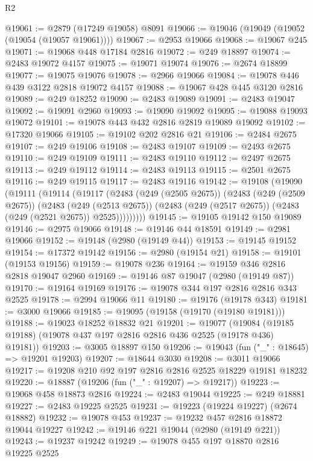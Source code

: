 \begin{lexlean}{R2}
\begin{coremodule}
@19061 := @2879 (@17249 @19058) @8091
@19066 := @19046 (@19049 (@19052 (@19054 (@19057 @19061))))
@19067 := @2953 @19066
@19068 := @19067 @245
@19071 := @19068 @448 @17184 @2816
@19072 := @249 @18897
@19074 := @2483 @19072 @4157
@19075 := @19071 @19074
@19076 := @2674 @18899
@19077 := @19075 @19076
@19078 := @2966 @19066
@19084 := @19078 @446 @439 @3122 @2818 @19072 @4157
@19088 := @19067 @428 @445 @3120 @2816
@19089 := @249 @18252
@19090 := @2483 @19089
@19091 := @2483 @19047
@19092 := @19091 @2960
@19093 := @19090 @19092
@19095 := @19088 @19093 @19072
@19101 := @19078 @443 @432 @2816 @2819 @19089 @19092
@19102 := @17320 @19066
@19105 := @19102 @202 @2816 @21
@19106 := @2484 @2675
@19107 := @249 @19106
@19108 := @2483 @19107
@19109 := @2493 @2675
@19110 := @249 @19109
@19111 := @2483 @19110
@19112 := @2497 @2675
@19113 := @249 @19112
@19114 := @2483 @19113
@19115 := @2501 @2675
@19116 := @249 @19115
@19117 := @2483 @19116
@19142 := @19108
    (@19090
      (@19111
        (@19114
          (@19117
            (@2483
              (@249 (@2505 @2675))
              (@2483
                (@249 (@2509 @2675))
                (@2483
                  (@249 (@2513 @2675))
                  (@2483 (@249 (@2517 @2675)) (@2483 (@249 (@2521 @2675)) @2525)))))))))
@19145 := @19105 @19142 @150 @19089
@19146 := @2975 @19066
@19148 := @19146 @44 @18591
@19149 := @2981 @19066
@19152 := @19148 (@2980 (@19149 @44))
@19153 := @19145 @19152
@19154 := @17372 @19142
@19156 := @2980 (@19154 @21)
@19158 := @19101 (@19153 @19156)
@19159 := @19078 @236
@19164 := @19159 @346 @2816 @2818 @19047 @2960
@19169 := @19146 @87 @19047 (@2980 (@19149 @87))
@19170 := @19164 @19169
@19176 := @19078 @344 @197 @2816 @2816 @343 @2525
@19178 := @2994 @19066 @11
@19180 := @19176 (@19178 @343)
@19181 := @3000 @19066
@19185 := @19095 (@19158 (@19170 (@19180 @19181)))
@19188 := @19023 @18252 @18832 @21
@19201 := @19077
    (@19084 (@19185 @19188) (@19078 @437 @197 @2816 @2816 @436 @2525 (@19178 @436) @19181))
@19203 := @3005 @18897 @150
@19206 := @19043 (fun ("_" : @18645) => @19201 @19203)
@19207 := @18644 @3030
@19208 := @3011 @19066
@19217 := @19208 @210 @92 @197 @2816 @2816 @2525 @18229 @19181 @18232
@19220 := @18887 (@19206 (fun ("_" : @19207) => @19217))
@19223 := @19068 @458 @18873 @2816
@19224 := @2483 @19044
@19225 := @249 @18881
@19227 := @2483 @19225 @2525
@19231 := @19223 (@19224 @19227) (@2674 @18882)
@19232 := @19078 @453
@19237 := @19232 @457 @2816 @18872 @19044 @19227
@19242 := @19146 @221 @19044 (@2980 (@19149 @221))
@19243 := @19237 @19242
@19249 := @19078 @455 @197 @18870 @2816 @19225 @2525

\end{coremodule}
\end{lexlean}
